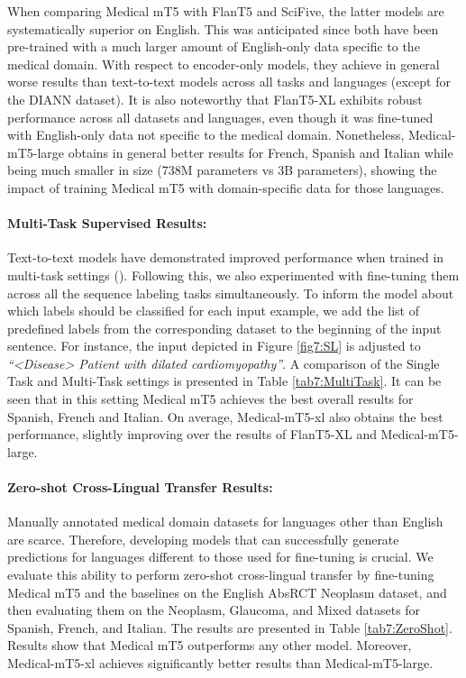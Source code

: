 When comparing Medical mT5 with FlanT5 and SciFive, the latter models are systematically superior on English. This was anticipated since both have been pre-trained with a much larger amount of English-only data specific to the medical domain. With respect to encoder-only models, they achieve in general worse results than text-to-text models across all tasks and languages (except for the DIANN dataset). It is also noteworthy that FlanT5-XL exhibits robust performance across all datasets and languages, even though it was fine-tuned with English-only data not specific to the medical domain. Nonetheless, Medical-mT5-large obtains in general better results for French, Spanish and Italian while being much smaller in size (738M parameters vs 3B parameters), showing the impact of training Medical mT5 with domain-specific data for those languages.



\paragraph{Multi-Task Supervised Results:} Text-to-text models have
demonstrated improved performance when trained in multi-task settings
(\cite{chung-flan-instruction-models}). Following this, we also experimented with fine-tuning them across all the sequence labeling tasks simultaneously. To inform the model about which labels should be classified for each input example, we add the list of predefined labels from the corresponding dataset to the beginning of the input sentence. For instance, the input depicted in Figure \ref{fig7:SL} is adjusted to \textit{``<Disease> Patient with dilated cardiomyopathy''}. A comparison of the Single Task and Multi-Task settings is presented in Table \ref{tab7:MultiTask}. It can be seen that in this setting Medical mT5 achieves the best overall results for Spanish, French and Italian. On average, Medical-mT5-xl also obtains the best performance, slightly improving over the results of FlanT5-XL and Medical-mT5-large.



\paragraph{Zero-shot Cross-Lingual Transfer Results:} Manually annotated medical domain datasets for languages other than English are scarce. Therefore, developing models that can successfully generate predictions for languages different to those used for fine-tuning is crucial. We evaluate this ability to perform zero-shot cross-lingual transfer by fine-tuning Medical mT5 and the baselines on the English AbsRCT Neoplasm dataset, and then evaluating them on the Neoplasm, Glaucoma, and Mixed datasets for Spanish, French, and Italian. The results are presented in Table \ref{tab7:ZeroShot}. Results show that Medical mT5 outperforms any other model. Moreover, Medical-mT5-xl achieves significantly better results than Medical-mT5-large. 

